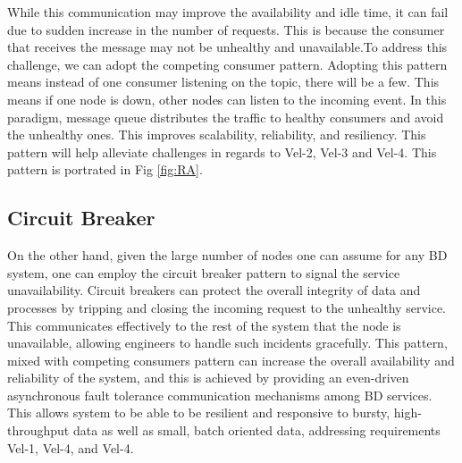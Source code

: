 \documentclass[a4paper,11pt,article,oneside]{memoir}
\begin{document}
While this communication may improve the availability and idle time, it can fail due to sudden increase in the number of requests. This is because the consumer that receives the message may not be unhealthy and unavailable.To address this challenge, we can adopt the competing consumer pattern. Adopting this pattern means instead of one consumer listening on the topic, there will be a few. This means if one node is down, other nodes can listen to the incoming event. In this paradigm, message queue distributes the traffic to healthy consumers and avoid the unhealthy ones. This improves scalability, reliability, and resiliency. This pattern will help alleviate challenges in regards to Vel-2, Vel-3 and Vel-4. This pattern is portrated in Fig \ref{fig:RA}.









\subsection{Circuit Breaker}

On the other hand, given the large number of nodes one can assume for any BD system, one can employ the circuit breaker pattern to signal the service unavailability. Circuit breakers can protect the overall integrity of data and processes by tripping and closing the incoming request to the unhealthy service. This communicates effectively to the rest of the system that the node is unavailable, allowing engineers to handle such incidents gracefully. This pattern, mixed with competing consumers pattern can increase the overall availability and reliability of the system, and this is achieved by providing an even-driven asynchronous fault tolerance communication mechanisms among BD services. This allows system to be able to be resilient and responsive to bursty, high-throughput data as well as small, batch oriented data, addressing requirements Vel-1, Vel-4, and Vel-4. 
    
\end{document}
